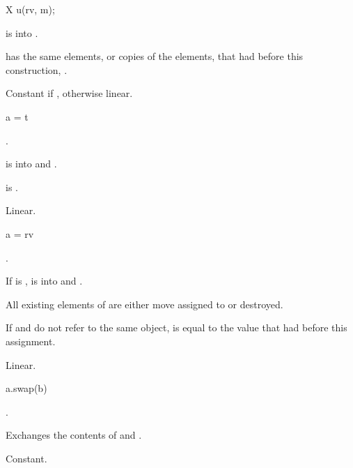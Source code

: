 \begin{itemdecl}
X u(rv, m);
\end{itemdecl}

\begin{itemdescr}
\pnum
\expects
{} is  into .

\pnum
\ensures
{} has the same elements, or copies of the elements,
that  had before this construction,
.

\pnum
\complexity
Constant if , otherwise linear.
\end{itemdescr}

\begin{itemdecl}
a = t
\end{itemdecl}

\begin{itemdescr}
\pnum
\result
{}.

\pnum
\expects
{} is  into  and
.

\pnum
\ensures
{} is .

\pnum
\complexity
Linear.
\end{itemdescr}

%
\begin{itemdecl}
a = rv
\end{itemdecl}

\begin{itemdescr}
\pnum
\result
{}.

\pnum
\expects
If
is ,
 is  into  and
.

\pnum
\effects
All existing elements of  are either move assigned to or destroyed.

\pnum
\ensures
If  and  do not refer to the same object,
 is equal to the value that  had before this assignment.

\pnum
\complexity
Linear.
\end{itemdescr}

%
\begin{itemdecl}
a.swap(b)
\end{itemdecl}

\begin{itemdescr}
\pnum
\result
{}.

\pnum
\effects
Exchanges the contents of  and .

\pnum
\complexity
Constant.
\end{itemdescr}


